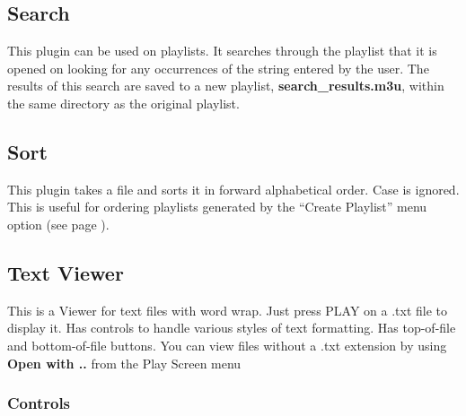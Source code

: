 \subsection{Search}
This plugin can be used on playlists.  It searches through the playlist
that it is opened on looking for any occurrences of the string entered by the
user.  The results of this search are saved to a new playlist,
\textbf{search\_results.m3u}, within the same directory as the
original playlist.

\subsection{Sort}
This plugin takes a file and sorts it in  forward alphabetical order.  Case is
ignored.  This is useful for ordering playlists generated by the ``Create Playlist'' menu option (see page \pageref{ref:Playlistsubmenu}).

\subsection{Text Viewer}
This is a Viewer for text files with word wrap. Just press PLAY on a
.txt file to display it. Has controls to handle various styles of text
formatting. Has top{}-of{}-file and bottom{}-of{}-file buttons.  You
can view files without a .txt extension by using \textbf{Open with ..}
from the Play Screen menu

\subsubsection{Controls}

